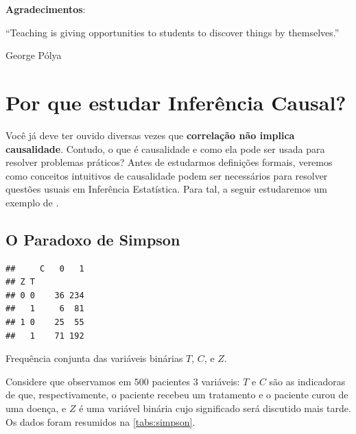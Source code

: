 



\maketitle

\vspace{20mm}

\textbf{Agradecimentos}: 

\newpage

\epigraph{
``Teaching is giving opportunities to students to discover things by themselves.''
}
{George P\'olya}
 
 
\newpage
 
\tableofcontents
  
\newpage




\chapter{Por que estudar Inferência Causal?}
\label{cap:intro}

Você já deve ter ouvido diversas vezes que
\textbf{correlação não implica causalidade}. Contudo,
o que é causalidade e como 
ela pode ser usada para resolver problemas práticos?
Antes de estudarmos definições formais,
veremos como conceitos intuitivos de causalidade
podem ser necessários para resolver questões
usuais em Inferência Estatística.
Para tal, a seguir estudaremos um exemplo de \citet{Glymour2016}.

\section{O Paradoxo de Simpson}
\label{sec:simpson}

\begin{table}
\begin{knitrout}
\color{fgcolor}\begin{kframe}
\begin{verbatim}
##     C   0   1
## Z T          
## 0 0    36 234
##   1     6  81
## 1 0    25  55
##   1    71 192
\end{verbatim}
\end{kframe}
\end{knitrout}
 \caption{Frequência conjunta 
 das variáveis binárias $T$, $C$, e $Z$.}
 \label{tabs:simpson}
\end{table}

Considere que observamos em $500$ pacientes $3$ variáveis: 
$T$ e $C$ são as indicadoras de que, respectivamente,
o paciente recebeu um tratamento e o paciente curou de uma doença, e
$Z$ é uma variável binária cujo significado será discutido mais tarde.
Os dados foram resumidos na \cref{tabs:simpson}.

